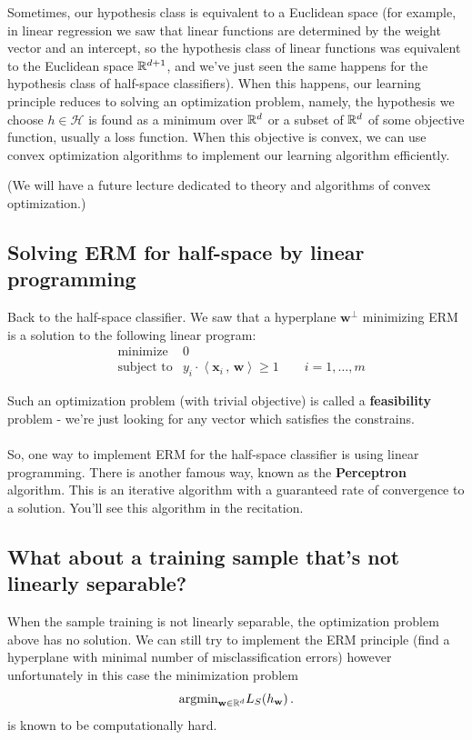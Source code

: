 \documentclass[11pt]{article}
\newcommand{\Hc}{\mathcal{H}}
\newcommand{\innerr}[2]{{\left\langle #1\,,\,#2 \right\rangle}}
\newcommand{\VV}[1]{\mathbf{#1}}
\begin{document}
Sometimes, our hypothesis class is equivalent to a Euclidean space (for example, in
  linear regression we saw that linear functions are determined by the weight
  vector and an intercept, so the hypothesis class of linear functions was equivalent to 
the Euclidean space $\mathbb{R}^{d+1}$, and we've just seen the same happens for
the hypothesis class of half-space classifiers). When this happens, our learning
principle reduces to solving an optimization problem, namely, the hypothesis we
choose $h\in\Hc$ is found as a minimum over $\mathbb{R}^d$ or a subset of $\mathbb{R}^d$
of some objective function, usually a loss function. When this objective is convex,
we can use convex optimization algorithms to implement our learning algorithm
 efficiently. 

(We will have a future lecture dedicated to theory and
algorithms of convex
optimization.)

\subsection{Solving ERM for half-space by linear programming}

Back to the half-space classifier. 
We saw that a hyperplane $\VV{w}^\perp$ minimizing ERM is a solution to the
following linear program:
 \begin{eqnarray*}
      & \text{minimize}   & 0 \\
     & \text{subject to} &  y_i \cdot  \innerr{\VV{x}_i}{\VV{w}}
       \geq 1  \qquad 
i=1,\ldots,m
    \end{eqnarray*}

    Such an optimization problem (with trivial objective) is called a {\bf
    feasibility} problem - we're just looking for any vector which satisfies the
    constrains. 
\\~\\
So, one way to implement ERM for the half-space classifier is using linear
programming. There is another famous way, known as the {\bf Perceptron} algorithm.
This is an iterative algorithm with a guaranteed rate of convergence to a
solution. You'll see this algorithm in the recitation.


\subsection{What about a training sample that's not linearly separable?}

When the sample training is not linearly separable, the optimization problem
above has no solution. We can still try to implement the ERM principle (find a
hyperplane with minimal number of misclassification errors) however
unfortunately in this case 
the minimization problem 
\[  \text{argmin}_{\VV{w}\in\reals^d} L_S(h_\VV{w})\,.\]
is known to be  computationally hard. 
\end{document}
